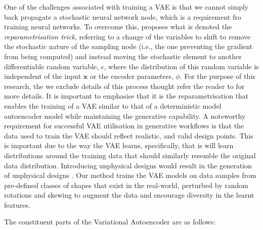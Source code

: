 \documentclass{article}
\begin{document}
One of the challenges associated with training a VAE is that we cannot simply back propagate a stochastic neural network node, which is a requirement fro training neural networks. To overcome this, \cite{Kingma2013} proposes what is denoted the \textit{reparametrisation trick}, referring to a change of the variables to shift to remove the stochastic nature of the sampling node (i.e., the one preventing the gradient from being computed) and instead moving the stochastic element to another differentiable random variable, $\epsilon$, where the distribution of this random variable is independent of the input $\textbf{x}$ or the encoder parameters, $\phi$. For the purpose of this research, the we exclude details of this process thought refer the reader to \cite{Kingma2013} for more details. It is important to emphasise that it is the reparametrisation that enables the training of a VAE similar to that of a deterministic model autoencoder model while maintaining the generative capability. A noteworthy requirement for successful VAE utilisation in generative workflows is that the data used to train the VAE should reflect realistic, and valid design points. This is important due to the way the VAE learns, specifically, that is will learn distributions around the training data that should similarly resemble the original data distribution. Introducing unphysical designs would result in the generation of unphysical designs \citep{Huang2022}. Our method trains the VAE models on data samples from pre-defined classes of shapes that exist in the real-world, perturbed by random rotations and skewing to augment the data and encourage diversity in the learnt features.

The constituent parts of the Variational Autoencoder are as follows:
\end{document}

